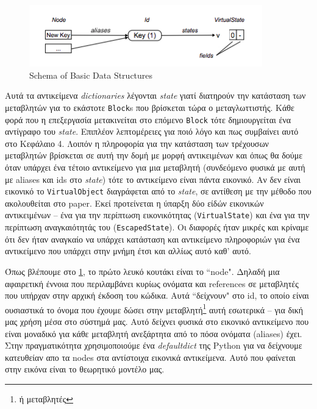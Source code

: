 \begin{figure}[h]
\centering
\includegraphics[width=0.9\textwidth]{DS-schema.png}
\caption{Schema of Basic Data Structures}
\label{figure-6}
\end{figure}

Αυτά τα αντικείμενα \textit{dictionaries} λέγονται \textit{state} γιατί
διατηρούν την κατάσταση των μεταβλητών για το εκάστοτε \texttt{Block}s που
βρίσκεται τώρα ο μεταγλωττιστής. Κάθε φορά που η επεξεργασία μετακινείται στο
επόμενο \texttt{Block} τότε δημιουργείται ένα αντίγραφο του \textit{state}.
Επιπλέον λεπτομέρειες για ποιό λόγο και πως συμβαίνει αυτό στο Κεφάλαιο 4.
Λοιπόν η πληροφορία για την κατάσταση των τρέχουσων μεταβλητών βρίσκεται σε αυτή
την δομή με μορφή αντικειμένων και όπως θα δούμε όταν υπάρχει ένα τέτοιο
αντικείμενο για μια μεταβλητή (συνδεόμενο φυσικά με αυτή με aliases και ids στο
\textit{state}) τότε το αντικείμενο είναι πάντα εικονικό. Αν δεν είναι εικονικό
το \texttt{VirtualObject} διαγράφεται από το \textit{state}, σε αντίθεση με την
μέθοδο που ακολουθείται στο paper. Εκεί προτείνεται η ύπαρξη δύο είδών εικονικών
αντικειμένων – ένα για την περίπτωση εικονικότητας (\texttt{VirtualState}) και
ένα για την περίπτωση αναγκαιότητάς του (\texttt{EscapedState}). Οι διαφορές
ήταν μικρές και κρίναμε ότι δεν ήταν αναγκαίο να υπάρχει κατάσταση και
αντικείμενο πληροφοριών για ένα αντικείμενο που υπάρχει στην μνήμη έτσι και
αλλίως αυτό καθ' αυτό.

Όπως βλέπουμε στο \ref{figure-6}, το πρώτο λευκό κουτάκι είναι το ``node". Δηλαδή
μια αφαιρετική έννοια που περιλαμβάνει κυρίως ονόματα και references σε
μεταβλητές που υπήρχαν στην αρχική έκδοση του κώδικα. Αυτά ``δείχνουν" στο id, το
οποίο είναι ουσιαστικά το όνομα που έχουμε δώσει στην μεταβλητή\footnote{ή
μεταβλητές} αυτή εσωτερικά – για δική μας χρήση μέσα στο σύστημά μας. Αυτό
δείχνει φυσικά στο εικονικό αντικείμενο που είναι μοναδικό για κάθε μεταβλητή
ανεξάρτητα από το πόσα ονόματα (aliases) έχει. Στην πραγματικότητα
χρησιμοποιούμε ένα \textit{defaultdict} της Python για να δείχνουμε κατευθείαν
απο τα nodes στα αντίστοιχα εικονικά αντικείμενα. Αυτό που φαίνεται στην εικόνα
είναι το θεωρητικό μοντέλο μας.

